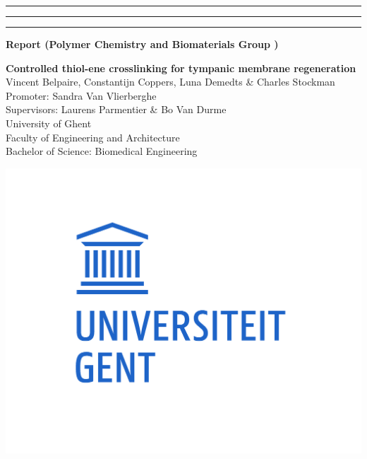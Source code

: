 {\color{ugent_blue} \hrule\hrule\hrule}

\vspace*{-0.43mm}
\colorbox{ugent_blue}{\color{white} \bf Report (Polymer Chemistry and Biomaterials Group )}\\

\noindent\begin{minipage}{0.7\textwidth}%
{\LARGE \bf \color{ugent_blue} Controlled thiol-ene crosslinking for tympanic membrane regeneration}\\[2mm]

%
{\large Vincent Belpaire, Constantijn Coppers, Luna Demedts \& Charles Stockman}\\
{Promoter: Sandra Van Vlierberghe}\\
{Supervisors: Laurens Parmentier \& Bo Van Durme}\\


{\small University of Ghent}\\
{\small Faculty of Engineering and Architecture}\\
{\small Bachelor of Science: Biomedical Engineering}\\
\end{minipage}%
\hfill%
\begin{minipage}{0.3\textwidth}
\vspace{-2.2cm}
\begin{center}
\includegraphics[width=\linewidth]{ugent_logo}
\end{center}
\end{minipage}\\